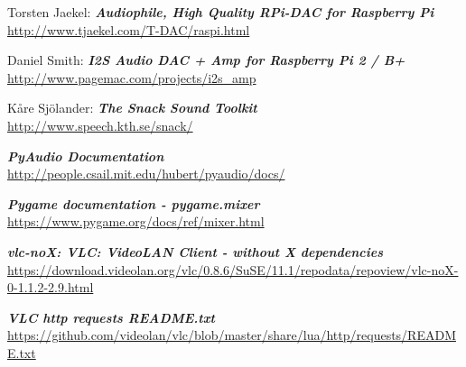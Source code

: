\documentclass[12pt,a4paper,hidelinks]{scrreprt}
\begin{document}
\begin{thebibliography}{99}
	Torsten Jaekel: \textbf{\textit{Audiophile, High Quality RPi-DAC for Raspberry Pi}}
	\\\url{http://www.tjaekel.com/T-DAC/raspi.html}
	
	Daniel Smith: \textbf{\textit{I2S Audio DAC + Amp for Raspberry Pi 2 / B+}}
	\\\url{http://www.pagemac.com/projects/i2s_amp}
	
	Kåre Sjölander: \textbf{\textit{The Snack Sound Toolkit}}
	\\\url{http://www.speech.kth.se/snack/}
	
	\textbf{\textit{PyAudio Documentation}}
	\\\url{http://people.csail.mit.edu/hubert/pyaudio/docs/}
	
	\textbf{\textit{Pygame documentation - pygame.mixer}}
	\\\url{https://www.pygame.org/docs/ref/mixer.html}
	
	\textbf{\textit{vlc-noX: VLC: VideoLAN Client - without X dependencies}}
	\\\url{https://download.videolan.org/vlc/0.8.6/SuSE/11.1/repodata/repoview/vlc-noX-0-1.1.2-2.9.html}
	
	\textbf{\textit{VLC http requests README.txt}}
	\\\url{https://github.com/videolan/vlc/blob/master/share/lua/http/requests/README.txt}
	
\end{thebibliography}


\end{document}

